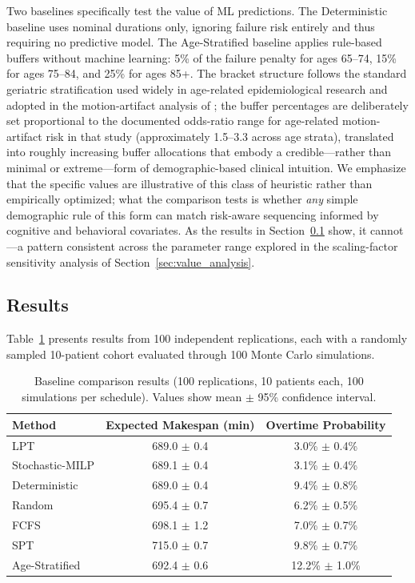 \documentclass[11pt,a4paper]{article}
\begin{document}
Two baselines specifically test the value of ML predictions. The Deterministic baseline uses nominal durations only, ignoring failure risk entirely and thus requiring no predictive model. The Age-Stratified baseline applies rule-based buffers without machine learning: 5\% of the failure penalty for ages 65--74, 15\% for ages 75--84, and 25\% for ages 85+. The bracket structure follows the standard geriatric stratification used widely in age-related epidemiological research and adopted in the motion-artifact analysis of \citet{porembka2025disparities}; the buffer percentages are deliberately set proportional to the documented odds-ratio range for age-related motion-artifact risk in that study (approximately 1.5--3.3 across age strata), translated into roughly increasing buffer allocations that embody a credible---rather than minimal or extreme---form of demographic-based clinical intuition. We emphasize that the specific values are illustrative of this class of heuristic rather than empirically optimized; what the comparison tests is whether \emph{any} simple demographic rule of this form can match risk-aware sequencing informed by cognitive and behavioral covariates. As the results in Section~\ref{sec:results} show, it cannot---a pattern consistent across the parameter range explored in the scaling-factor sensitivity analysis of Section~\ref{sec:value_analysis}.


\subsection{Results}
\label{sec:results}

Table~\ref{tab:baseline_results} presents results from 100 independent replications, each with a randomly sampled 10-patient cohort evaluated through 100 Monte Carlo simulations.

\begin{table}[htbp]
\centering
\caption{Baseline comparison results (100 replications, 10 patients each, 100 simulations per schedule). Values show mean $\pm$ 95\% confidence interval.}
\label{tab:baseline_results}
\begin{tabular}{@{}lcc@{}}
\toprule
\textbf{Method} & \textbf{Expected Makespan (min)} & \textbf{Overtime Probability} \\
\midrule
LPT & 689.0 $\pm$ 0.4 & 3.0\% $\pm$ 0.4\% \\
Stochastic-MILP & 689.1 $\pm$ 0.4 & 3.1\% $\pm$ 0.4\% \\
Deterministic & 689.0 $\pm$ 0.4 & 9.4\% $\pm$ 0.8\% \\
Random & 695.4 $\pm$ 0.7 & 6.2\% $\pm$ 0.5\% \\
FCFS & 698.1 $\pm$ 1.2 & 7.0\% $\pm$ 0.7\% \\
SPT & 715.0 $\pm$ 0.7 & 9.8\% $\pm$ 0.7\% \\
Age-Stratified & 692.4 $\pm$ 0.6 & 12.2\% $\pm$ 1.0\% \\
\bottomrule
\end{tabular}
\end{table}
\end{document}
